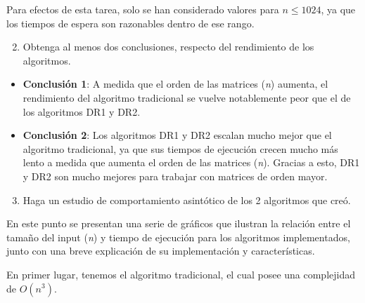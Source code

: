 \documentclass[12pt]{report}
\begin{document}
  Para efectos de esta tarea, solo se han considerado valores para $ n \leq 1024 $, ya que los tiempos de espera son razonables dentro de ese rango.
  
  \begin{enumerate}
    \setcounter{enumi}{1}
    \item Obtenga al menos dos conclusiones, respecto del rendimiento de los algoritmos.
  \end{enumerate}
  
  \begin{itemize}
    \item \textbf{Conclusión 1}: A medida que el orden de las matrices (\textit{n}) aumenta, el rendimiento del algoritmo tradicional se vuelve notablemente peor que el de los algoritmos DR1 y DR2.
    \item \textbf{Conclusión 2}: Los algoritmos DR1 y DR2 escalan mucho mejor que el algoritmo tradicional, ya que sus tiempos de ejecución crecen mucho más lento a medida que aumenta el orden de las matrices (\textit{n}). Gracias a esto, DR1 y DR2 son mucho mejores para trabajar con matrices de orden mayor.
  \end{itemize}

  \newpage
  
  \begin{enumerate}
    \setcounter{enumi}{2}
    \item Haga un estudio de comportamiento asintótico de los 2 algoritmos que creó.
  \end{enumerate}
  
  En este punto se presentan una serie de gráficos que ilustran la relación entre el tamaño del input (\textit{n}) y tiempo de ejecución para los algoritmos implementados, junto con una breve explicación de su implementación y características.
  
  En primer lugar, tenemos el algoritmo tradicional, el cual posee una complejidad de $ O(n^3) $.

  \begin{center}
  \end{center}
    
\end{document}

